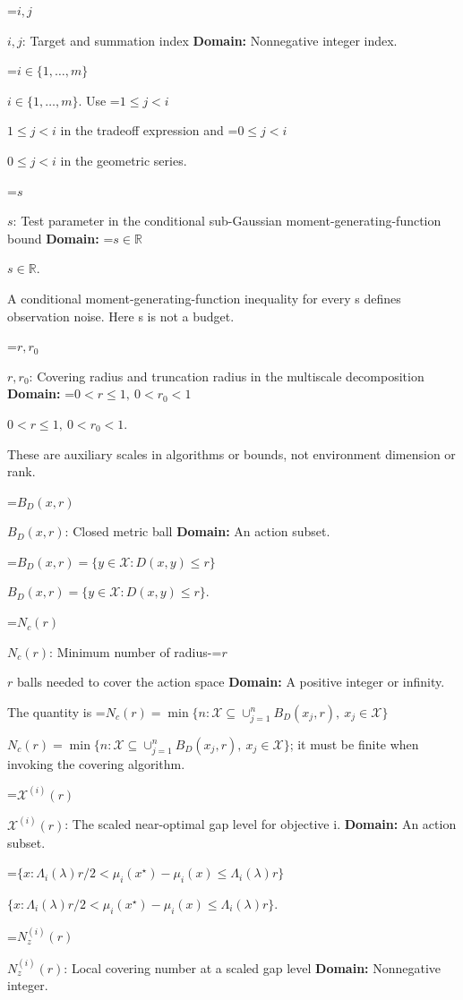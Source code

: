 \documentclass[10pt,a4paper]{article}
\newcommand{\AtlasMath}[1]{\par\begingroup\centering\setbox0=\hbox{$\displaystyle #1$}\ifdim\wd0>1.4\linewidth\typeout{ATLAS WIDE FORMULA: \the\wd0}\fi\ifdim\wd0>\linewidth\resizebox{\linewidth}{!}{\box0}\else\box0\fi\par\endgroup}
\newcommand{\AtlasInlineMath}[1]{\begingroup\setbox0=\hbox{$#1$}\ifdim\wd0>.4\linewidth\endgroup\AtlasMath{#1}\else\endgroup$#1$\fi}
\begin{document}
\AtlasInlineMath{i,j}: Target and summation index \textbf{Domain:} Nonnegative integer index.



\AtlasInlineMath{i\in\{1,\ldots,m\}}. Use \AtlasInlineMath{1\le j<i} in the tradeoff expression and \AtlasInlineMath{0\le j<i} in the geometric series.



\AtlasInlineMath{s}: Test parameter in the conditional sub-Gaussian moment-generating-function bound \textbf{Domain:} \AtlasInlineMath{s\in\mathbb R}.



A conditional moment-generating-function inequality for every s defines observation noise. Here s is not a budget.



\AtlasInlineMath{r,r_0}: Covering radius and truncation radius in the multiscale decomposition \textbf{Domain:} \AtlasInlineMath{0<r\le1,\ 0<r_0<1}.



These are auxiliary scales in algorithms or bounds, not environment dimension or rank.



\AtlasInlineMath{B_D(x,r)}: Closed metric ball \textbf{Domain:} An action subset.



\AtlasInlineMath{B_D(x,r)=\{y\in\mathcal X:D(x,y)\le r\}}.



\AtlasInlineMath{N_c(r)}: Minimum number of radius-\AtlasInlineMath{r} balls needed to cover the action space \textbf{Domain:} A positive integer or infinity.



The quantity is \AtlasInlineMath{N_c(r)=\min\{n:\mathcal X\subseteq\cup_{j=1}^nB_D(x_j,r),\ x_j\in\mathcal X\}}; it must be finite when invoking the covering algorithm.



\AtlasInlineMath{\mathcal X^{(i)}(r)}: The scaled near-optimal gap level for objective i. \textbf{Domain:} An action subset.



\AtlasInlineMath{\{x:\Lambda_i(\lambda)r/2<\mu_i(x^\star)-\mu_i(x)\le\Lambda_i(\lambda)r\}}.



\AtlasInlineMath{N_z^{(i)}(r)}: Local covering number at a scaled gap level \textbf{Domain:} Nonnegative integer.
\end{document}
